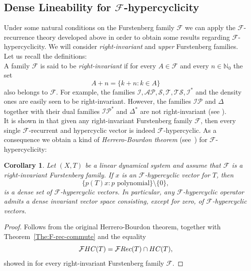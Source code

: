 \documentclass[openright,11pt]{article}
\theoremstyle{plain}
\newtheorem{corollary}[theorem]{Corollary}
\theoremstyle{definition}
\newcommand{\NN}{\mathbb{N}}
\newcommand{\AP}{\mathcal{AP}}
\newcommand{\Del}{\Delta}
\newcommand{\Fc}{\mathcal{F}}
\newcommand{\Ic}{\mathcal{I}}
\newcommand{\IP}{\mathcal{IP}}
\newcommand{\Sc}{\mathcal{S}}
\newcommand{\Tc}{\mathcal{T}}
\newcommand{\TS}{\mathcal{TS}}
\newcommand{\Rec}{\textup{Rec}}
\newcommand{\HC}{\textup{HC}}
\begin{document}
\subsection{Dense Lineability for $\Fc$-hypercyclicity}\label{SubSec:5.3dense.lin.F-hyp}

Under some natural conditions on the Furstenberg family $\Fc$ we can apply the $\Fc$-recurrence theory developed above in order to obtain some results regarding $\Fc$-hypercyclicity. We will consider {\em right-invariant} and {\em upper} Furstenberg families. Let us recall the definitions:\\[-5pt]

A family $\Fc$ is said to be {\em right-invariant} if for every $A \in \Fc$ and every $n \in \NN_0$ the set
\[
A+n = \{k+n : k \in A\}
\]
also belongs to $\Fc$. For example, the families $\Ic, \AP, \Sc, \Tc, \TS, \Ic^*$ and the density ones are easily seen to be right-invariant. However, the families $\IP$ and $\Del$ together with their dual families $\IP^*$ and $\Del^*$ are not right-invariant (see \cite[Proposition~5.6]{BMPP2019}).\\[-5pt]

It is shown in \cite{BoGrLoPe2022} that given any right-invariant Furstenberg family $\Fc$, then every single $\Fc$-recurrent and hypercyclic vector is indeed $\Fc$-hypercyclic. As a consequence we obtain a kind of {\em Herrero-Bourdon theorem} (see~\cite[Theorem 2.55]{GrPe2011_book}) for $\Fc$-hypercyclicity:

\begin{corollary}
	Let $(X,T)$ be a linear dynamical system and assume that $\Fc$ is a right-invariant Furstenberg family. If $x$ is an $\Fc$-hypercyclic vector for $T$, then
	\[
	\{ p(T)x : p \text{ polynomial} \}\setminus\{0\},
	\]
	is a dense set of $\Fc$-hypercyclic vectors. In particular, any $\Fc$-hypercyclic operator admits a dense invariant vector space consisting, except for zero, of $\Fc$-hypercyclic vectors.
\end{corollary}
\begin{proof}
	Follows from the original Herrero-Bourdon theorem, together with Theorem~\ref{The:F-rec-commute} and the equality
	\[
	\Fc\HC(T) = \Fc\Rec(T) \cap \HC(T),
	\]
	showed in \cite{BoGrLoPe2022} for every right-invariant Furstenberg family $\Fc$.
\end{proof}
\end{document}
